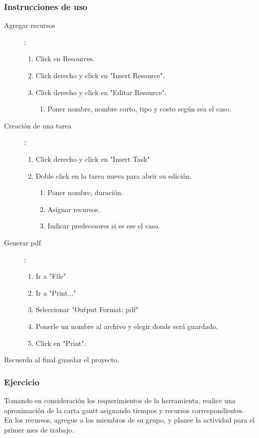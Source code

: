 \subsubsection{Instrucciones de uso}
\begin{description}
    \item[Agregar recursos]:
\begin{enumerate}
    \item Click en Resources.
    \item Click derecho y click en "Insert Resource".
    \item Click derecho y click en "Editar Resource".
    \begin{enumerate}
        \item Poner nombre, nombre corto, tipo y costo según sea el caso.
    \end{enumerate}
\end{enumerate}

    \item[Creación de una tarea]:
\begin{enumerate}
    \item Click derecho y click en "Insert Task"
    \item Doble click en la tarea nueva para abrir su edición.
    \begin{enumerate}
        \item Poner nombre, duración.
        \item Asignar recursos.
        \item Indicar predecesores si es ese el caso.
    \end{enumerate}
\end{enumerate}

    \item[Generar pdf]:
\begin{enumerate}
    \item Ir a "File"
    \item Ir a "Print..."
    \item Seleccionar "Output Format: pdf"
    \item Ponerle un nombre al archivo y elegir donde será guardado.
    \item Click en "Print".
\end{enumerate}


\item[Recuerda al final guardar el proyecto.]

\end{description}

\subsubsection{Ejercicio}
Tomando en consideración los requerimientos de la herramienta, realice una
aproximación de la carta gantt asignando tiempos y recursos correspondientes.
En los recursos, agregue a los miembros de su grupo, y planee la actividad
para el primer mes de trabajo.

